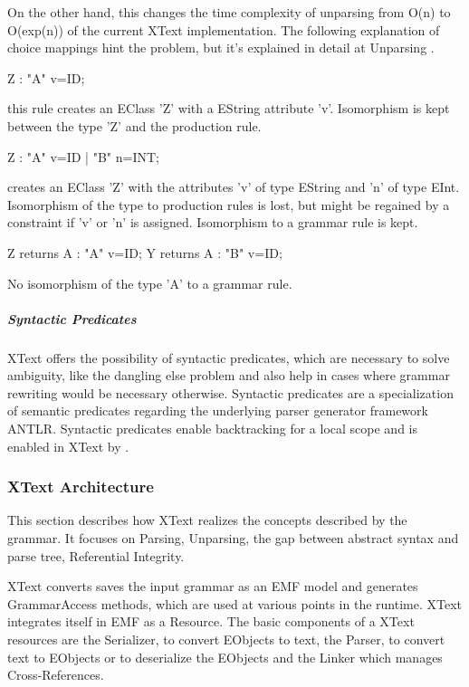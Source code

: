 On the other hand, this changes the time complexity of unparsing from O(n) to O(exp(n)) of the current XText implementation. The following explanation of choice mappings hint the problem, but it's explained in detail at Unparsing .
\begin{xtxt}
Z 	:  "A" v=ID;
\end{xtxt}
this rule creates an EClass 'Z' with a EString attribute 'v'. Isomorphism is kept between the type 'Z' and the production rule.
\begin{xtxt}
Z 	:  "A" v=ID  
	|  "B" n=INT;
	\end{xtxt}
creates an EClass 'Z' with the attributes 'v' of type EString and 'n' of type EInt.  Isomorphism of the type to production rules is lost, but might be regained by a constraint if 'v' or 'n' is assigned. Isomorphism to a grammar rule is kept.
\begin{xtxt}
Z returns A : "A" v=ID;
Y returns A : "B" v=ID;
\end{xtxt}
No isomorphism of the type 'A' to a grammar rule.

\subparagraph{Syntactic Predicates}
XText offers the possibility of syntactic predicates, which are necessary to solve ambiguity, like the dangling else problem and also help in cases where grammar rewriting would be necessary otherwise. Syntactic predicates are a specialization of semantic predicates regarding the underlying parser generator framework ANTLR. Syntactic predicates enable backtracking for a local scope and is enabled in XText by \code{=>}.






\subsubsection{XText Architecture}
\label{cha:xtextarch}
This section describes how XText realizes the concepts described by the grammar. It focuses on Parsing, Unparsing, the gap between abstract syntax and parse tree, Referential Integrity. 

XText converts saves the input grammar as an EMF model and generates GrammarAccess methods, which are used at various points in the runtime. XText integrates itself in EMF as a Resource.  The basic components of a XText resources are the Serializer, to convert EObjects to text, the Parser, to convert text to EObjects or to deserialize the EObjects and the Linker which manages Cross-References. 
